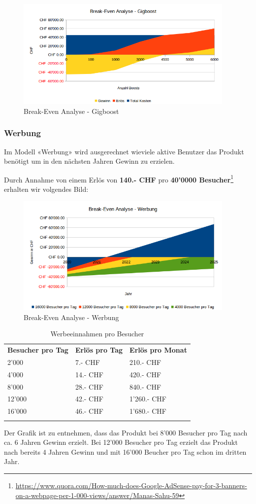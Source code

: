 \begin{figure}[!htb]
  \centering
  \includegraphics[width=0.95\textwidth]{initialisierung/wirtschaftlichkeit-gigboost.png}
  \caption{Break-Even Analyse - Gigboost}
\end{figure}

\clearpage
\subsubsection{Werbung}

Im Modell «Werbung» wird ausgerechnet wieviele aktive Benutzer das Produkt benötigt
um in den nächsten Jahren Gewinn zu erzielen.

Durch Annahme von einem Erlös von \textbf{140.- CHF} pro \textbf{40'0000 Besucher}\footnote{\url{https://www.quora.com/How-much-does-Google-AdSense-pay-for-3-banners-on-a-webpage-per-1-000-views/answer/Manas-Sahu-59}} erhalten wir volgendes Bild:

\begin{figure}[!htb]
  \centering
  \includegraphics[width=0.95\textwidth]{initialisierung/wirtschaftlichkeit-werbung.png}
  \caption{Break-Even Analyse - Werbung}
\end{figure}

\begin{longtable}[]{@{}lll@{}}
  \toprule
  \textbf{Besucher pro Tag} & \textbf{Erlös pro Tag} & \textbf{Erlös pro Monat}\tabularnewline
   2'000                    & 7.- CHF                & 210.- CHF\tabularnewline
   4'000                    & 14.- CHF               & 420.- CHF\tabularnewline
   8'000                    & 28.- CHF               & 840.- CHF\tabularnewline
  12'000                    & 42.- CHF               & 1'260.- CHF\tabularnewline
  16'000                    & 46.- CHF               & 1'680.- CHF\tabularnewline
  \bottomrule
  \caption{Werbeeinnahmen pro Besucher}
\end{longtable}

Der Grafik ist zu entnehmen, dass das Produkt bei 8'000 Besucher pro Tag nach ca. 6 Jahren Gewinn erzielt. Bei 12'000 Besucher pro Tag erzielt das Produkt nach bereits 4 Jahren Gewinn und mit 16'000 Beucher pro Tag schon im dritten Jahr.
